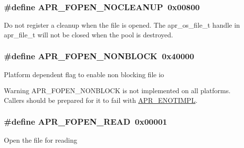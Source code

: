 \subsubsection[{\texorpdfstring{A\+P\+R\+\_\+\+F\+O\+P\+E\+N\+\_\+\+N\+O\+C\+L\+E\+A\+N\+UP}{APR_FOPEN_NOCLEANUP}}]{\setlength{\rightskip}{0pt plus 5cm}\#define A\+P\+R\+\_\+\+F\+O\+P\+E\+N\+\_\+\+N\+O\+C\+L\+E\+A\+N\+UP~0x00800}\hypertarget{group__apr__file__open__flags_ga3fc9b5a7791d9f462997cd29de67eb80}{}\label{group__apr__file__open__flags_ga3fc9b5a7791d9f462997cd29de67eb80}
Do not register a cleanup when the file is opened. The apr\+\_\+os\+\_\+file\+\_\+t handle in apr\+\_\+file\+\_\+t will not be closed when the pool is destroyed. 
\subsubsection[{\texorpdfstring{A\+P\+R\+\_\+\+F\+O\+P\+E\+N\+\_\+\+N\+O\+N\+B\+L\+O\+CK}{APR_FOPEN_NONBLOCK}}]{\setlength{\rightskip}{0pt plus 5cm}\#define A\+P\+R\+\_\+\+F\+O\+P\+E\+N\+\_\+\+N\+O\+N\+B\+L\+O\+CK~0x40000}\hypertarget{group__apr__file__open__flags_ga31e4d14068147e43e1778bcf975dda62}{}\label{group__apr__file__open__flags_ga31e4d14068147e43e1778bcf975dda62}
Platform dependent flag to enable non blocking file io

\begin{DoxyWarning}{Warning}
A\+P\+R\+\_\+\+F\+O\+P\+E\+N\+\_\+\+N\+O\+N\+B\+L\+O\+CK is not implemented on all platforms. Callers should be prepared for it to fail with \hyperlink{group___a_p_r___error_ga939ddb834a30bc9a5a0a329b13000161}{A\+P\+R\+\_\+\+E\+N\+O\+T\+I\+M\+PL}. 
\end{DoxyWarning}
\subsubsection[{\texorpdfstring{A\+P\+R\+\_\+\+F\+O\+P\+E\+N\+\_\+\+R\+E\+AD}{APR_FOPEN_READ}}]{\setlength{\rightskip}{0pt plus 5cm}\#define A\+P\+R\+\_\+\+F\+O\+P\+E\+N\+\_\+\+R\+E\+AD~0x00001}\hypertarget{group__apr__file__open__flags_gaf9e7303f028b130ff7d4b209d6662d7d}{}\label{group__apr__file__open__flags_gaf9e7303f028b130ff7d4b209d6662d7d}
Open the file for reading 
